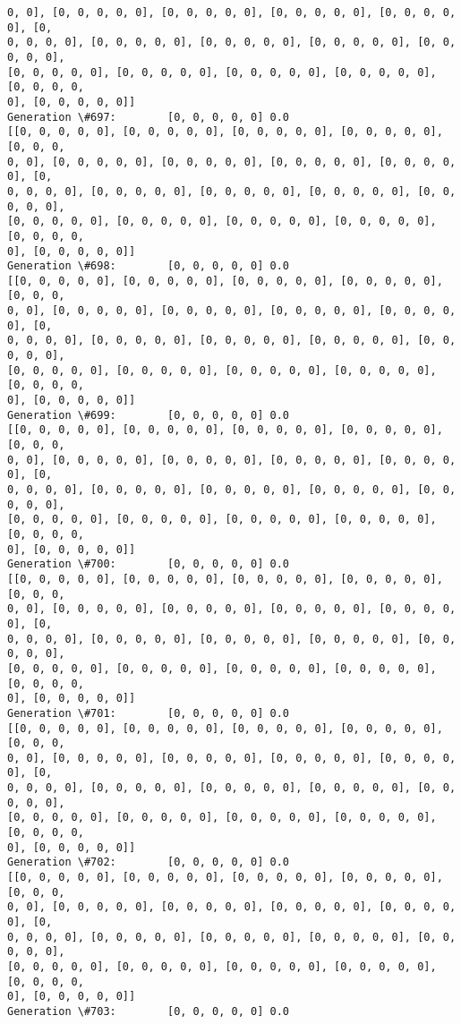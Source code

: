 \documentclass[11pt]{article}
\begin{document}
\begin{Verbatim}[commandchars=\\\{\}]
0, 0], [0, 0, 0, 0, 0], [0, 0, 0, 0, 0], [0, 0, 0, 0, 0], [0, 0, 0, 0, 0], [0,
0, 0, 0, 0], [0, 0, 0, 0, 0], [0, 0, 0, 0, 0], [0, 0, 0, 0, 0], [0, 0, 0, 0, 0],
[0, 0, 0, 0, 0], [0, 0, 0, 0, 0], [0, 0, 0, 0, 0], [0, 0, 0, 0, 0], [0, 0, 0, 0,
0], [0, 0, 0, 0, 0]]
Generation \#697:        [0, 0, 0, 0, 0] 0.0
[[0, 0, 0, 0, 0], [0, 0, 0, 0, 0], [0, 0, 0, 0, 0], [0, 0, 0, 0, 0], [0, 0, 0,
0, 0], [0, 0, 0, 0, 0], [0, 0, 0, 0, 0], [0, 0, 0, 0, 0], [0, 0, 0, 0, 0], [0,
0, 0, 0, 0], [0, 0, 0, 0, 0], [0, 0, 0, 0, 0], [0, 0, 0, 0, 0], [0, 0, 0, 0, 0],
[0, 0, 0, 0, 0], [0, 0, 0, 0, 0], [0, 0, 0, 0, 0], [0, 0, 0, 0, 0], [0, 0, 0, 0,
0], [0, 0, 0, 0, 0]]
Generation \#698:        [0, 0, 0, 0, 0] 0.0
[[0, 0, 0, 0, 0], [0, 0, 0, 0, 0], [0, 0, 0, 0, 0], [0, 0, 0, 0, 0], [0, 0, 0,
0, 0], [0, 0, 0, 0, 0], [0, 0, 0, 0, 0], [0, 0, 0, 0, 0], [0, 0, 0, 0, 0], [0,
0, 0, 0, 0], [0, 0, 0, 0, 0], [0, 0, 0, 0, 0], [0, 0, 0, 0, 0], [0, 0, 0, 0, 0],
[0, 0, 0, 0, 0], [0, 0, 0, 0, 0], [0, 0, 0, 0, 0], [0, 0, 0, 0, 0], [0, 0, 0, 0,
0], [0, 0, 0, 0, 0]]
Generation \#699:        [0, 0, 0, 0, 0] 0.0
[[0, 0, 0, 0, 0], [0, 0, 0, 0, 0], [0, 0, 0, 0, 0], [0, 0, 0, 0, 0], [0, 0, 0,
0, 0], [0, 0, 0, 0, 0], [0, 0, 0, 0, 0], [0, 0, 0, 0, 0], [0, 0, 0, 0, 0], [0,
0, 0, 0, 0], [0, 0, 0, 0, 0], [0, 0, 0, 0, 0], [0, 0, 0, 0, 0], [0, 0, 0, 0, 0],
[0, 0, 0, 0, 0], [0, 0, 0, 0, 0], [0, 0, 0, 0, 0], [0, 0, 0, 0, 0], [0, 0, 0, 0,
0], [0, 0, 0, 0, 0]]
Generation \#700:        [0, 0, 0, 0, 0] 0.0
[[0, 0, 0, 0, 0], [0, 0, 0, 0, 0], [0, 0, 0, 0, 0], [0, 0, 0, 0, 0], [0, 0, 0,
0, 0], [0, 0, 0, 0, 0], [0, 0, 0, 0, 0], [0, 0, 0, 0, 0], [0, 0, 0, 0, 0], [0,
0, 0, 0, 0], [0, 0, 0, 0, 0], [0, 0, 0, 0, 0], [0, 0, 0, 0, 0], [0, 0, 0, 0, 0],
[0, 0, 0, 0, 0], [0, 0, 0, 0, 0], [0, 0, 0, 0, 0], [0, 0, 0, 0, 0], [0, 0, 0, 0,
0], [0, 0, 0, 0, 0]]
Generation \#701:        [0, 0, 0, 0, 0] 0.0
[[0, 0, 0, 0, 0], [0, 0, 0, 0, 0], [0, 0, 0, 0, 0], [0, 0, 0, 0, 0], [0, 0, 0,
0, 0], [0, 0, 0, 0, 0], [0, 0, 0, 0, 0], [0, 0, 0, 0, 0], [0, 0, 0, 0, 0], [0,
0, 0, 0, 0], [0, 0, 0, 0, 0], [0, 0, 0, 0, 0], [0, 0, 0, 0, 0], [0, 0, 0, 0, 0],
[0, 0, 0, 0, 0], [0, 0, 0, 0, 0], [0, 0, 0, 0, 0], [0, 0, 0, 0, 0], [0, 0, 0, 0,
0], [0, 0, 0, 0, 0]]
Generation \#702:        [0, 0, 0, 0, 0] 0.0
[[0, 0, 0, 0, 0], [0, 0, 0, 0, 0], [0, 0, 0, 0, 0], [0, 0, 0, 0, 0], [0, 0, 0,
0, 0], [0, 0, 0, 0, 0], [0, 0, 0, 0, 0], [0, 0, 0, 0, 0], [0, 0, 0, 0, 0], [0,
0, 0, 0, 0], [0, 0, 0, 0, 0], [0, 0, 0, 0, 0], [0, 0, 0, 0, 0], [0, 0, 0, 0, 0],
[0, 0, 0, 0, 0], [0, 0, 0, 0, 0], [0, 0, 0, 0, 0], [0, 0, 0, 0, 0], [0, 0, 0, 0,
0], [0, 0, 0, 0, 0]]
Generation \#703:        [0, 0, 0, 0, 0] 0.0

\end{Verbatim}
\end{document}
